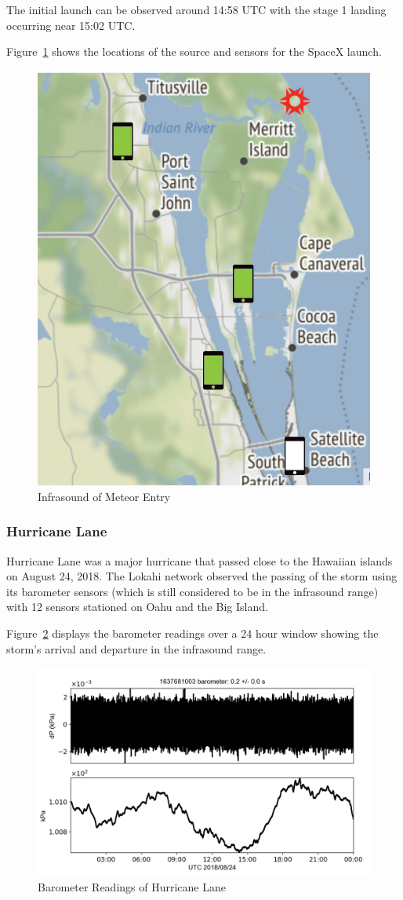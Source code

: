The initial launch can be observed around 14:58 UTC with the stage 1 landing occurring near 15:02 UTC.

Figure~\ref{fig:spacex_2} shows the locations of the source and sensors for the SpaceX launch.

\begin{figure}[H]
    \centering
    \includegraphics[width=.5\linewidth]{figures/spacex_2.png}
    \caption{Infrasound of Meteor Entry}
    \label{fig:spacex_2}
\end{figure}

\subsubsection{Hurricane Lane}

Hurricane Lane was a major hurricane that passed close to the Hawaiian islands on August 24, 2018\cite{wiki:Hurricane_Lane}. The Lokahi network observed the passing of the storm using its barometer sensors (which is still considered to be in the infrasound range) with 12 sensors stationed on Oahu and the Big Island.

Figure~\ref{fig:hurricane_1} displays the barometer readings over a 24 hour window showing the storm's arrival and departure in the infrasound range.

\begin{figure}[H]
    \centering
    \includegraphics[width=\linewidth]{figures/hurricane_1.png}
    \caption{Barometer Readings of Hurricane Lane}
    \label{fig:hurricane_1}
\end{figure}

